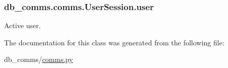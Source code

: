 \subsubsection[{user}]{\setlength{\rightskip}{0pt plus 5cm}db\+\_\+comms.\+comms.\+User\+Session.\+user}\label{classdb__comms_1_1comms_1_1_user_session_a58e9af88b36c5f977134a1bf8582a85b}


Active user. 



The documentation for this class was generated from the following file\+:\begin{DoxyCompactItemize}
\item 
db\+\_\+comms/\hyperlink{comms_8py}{comms.\+py}\end{DoxyCompactItemize}
